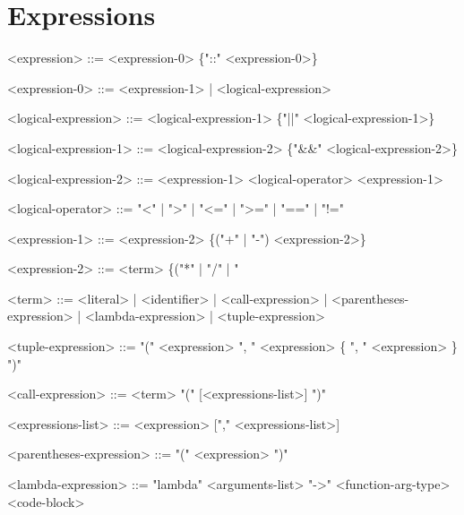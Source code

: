 \documentclass{article}
\begin{document}
\section{Expressions}
\begin{grammar}
<expression> ::= <expression-0> \{"::" <expression-0>\}

<expression-0> ::= <expression-1> | <logical-expression>

<logical-expression> ::= <logical-expression-1> \{"||" <logical-expression-1>\}

<logical-expression-1> ::= <logical-expression-2> \{"&&" <logical-expression-2>\}

<logical-expression-2> ::= <expression-1> <logical-operator> <expression-1>

<logical-operator> ::= "\textless" | "\textgreater" | "\textless=" | "\textgreater=" | "==" | "!="

<expression-1> ::= <expression-2> \{("+" | "-") <expression-2>\}

<expression-2> ::= <term> \{("*" | "/" | "%

<term> ::= <literal> | <identifier> | <call-expression> | <parentheses-expression> | <lambda-expression> | <tuple-expression> 

<tuple-expression> ::= "(" <expression> ", " <expression> \{ ", " <expression> \} ")"

<call-expression> ::= <term> "(" [<expressions-list>] ")"

<expressions-list> ::= <expression> ["," <expressions-list>]

<parentheses-expression> ::= "(" <expression> ")"

<lambda-expression> ::= "lambda" <arguments-list> "->" <function-arg-type> <code-block>

\end{grammar}
\end{document}

